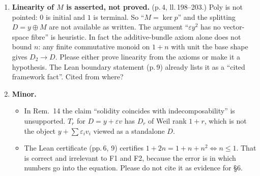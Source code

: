 \documentclass[11pt]{article}
\begin{document}
\begin{enumerate}[label=\textbf{F\arabic*.},leftmargin=*]
\item \textbf{Linearity of $M$ is asserted, not proved.} (p.\,4, ll.\,198--203.) Poly is not
pointed: $0$ is initial and $1$ is terminal. So ``$M=\ker p$'' and the splitting $D=y\oplus M$ are
not available as written. The argument ``$\varepsilon y^2$ has no vector-space fibre'' is
heuristic. In fact the additive-bundle axiom alone does not bound $n$: any finite commutative
monoid on $1+n$ with unit the base shape gives $D_2\to D$. Please either prove linearity from the
axioms or make it a hypothesis. The Lean boundary statement (p.\,9) already lists it as a ``cited
framework fact''. Cited from where?

\item \textbf{Minor.}
\begin{itemize}[leftmargin=1.2em]
\item In Rem.~14 the claim ``solidity coincides with indecomposability'' is unsupported. $T_r$
for $D=y+\varepsilon v$ has $D_r$ of Weil rank $1+r$, which is not the object $y+\sum\varepsilon_i
v_i$ viewed as a standalone $D$.
\item The Lean certificate (pp.\,6, 9) certifies $1+2n=1+n+n^2\iff n\le1$. That is correct and
irrelevant to F1 and F2, because the error is in which numbers go into the equation. Please do not
cite it as evidence for \S6.
\end{itemize}
\end{enumerate}
\end{document}
